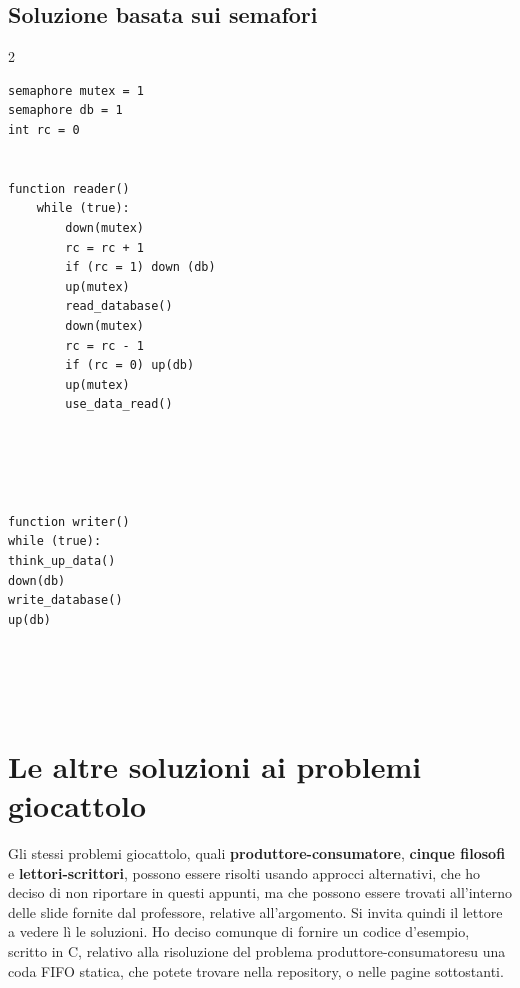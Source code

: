\documentclass{report}
\begin{document}
\subsection{Soluzione basata sui semafori}
\begin{multicols}{2}
\begin{verbatim}
semaphore mutex = 1
semaphore db = 1
int rc = 0


function reader()
    while (true):
        down(mutex)
        rc = rc + 1
        if (rc = 1) down (db)
        up(mutex)
        read_database()
        down(mutex)
        rc = rc - 1
        if (rc = 0) up(db)
        up(mutex)
        use_data_read()





function writer()
while (true):
think_up_data()
down(db)
write_database()
up(db)





\end{verbatim}
\end{multicols}

\section{Le altre soluzioni ai problemi giocattolo}

Gli stessi problemi giocattolo, quali \textbf{produttore-consumatore}, \textbf{cinque filosofi} e \textbf{lettori-scrittori}, possono essere risolti usando approcci alternativi, che ho deciso di non riportare in questi appunti, ma che possono essere trovati all'interno delle slide fornite dal professore, relative all'argomento. 
Si invita quindi il lettore a vedere lì le soluzioni. Ho deciso comunque di fornire un codice d'esempio, scritto in C, relativo alla risoluzione del problema produttore-consumatoresu una coda FIFO statica, che potete trovare nella repository, o nelle pagine sottostanti.
\end{document}
